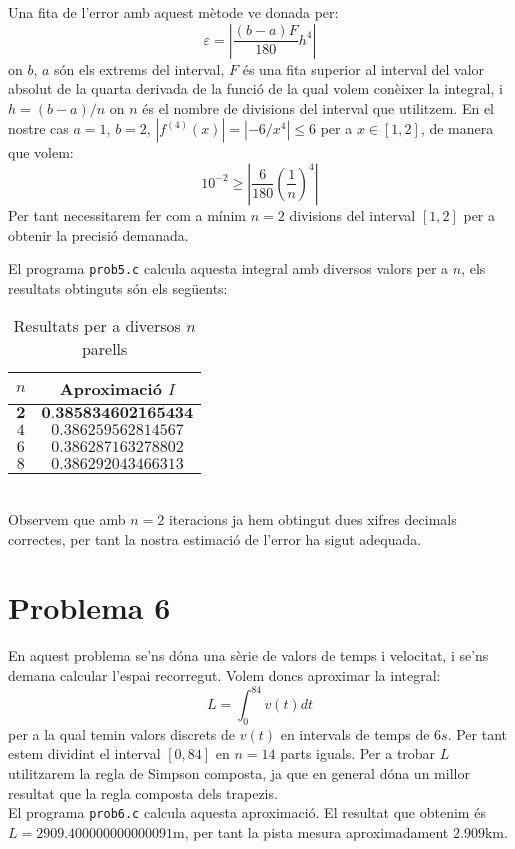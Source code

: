 \documentclass[12pt]{article}
\numberwithin{table}{section}
\numberwithin{figure}{section}
\numberwithin{equation}{section}
\begin{document}
	Una fita de l'error amb aquest mètode ve donada per:
	$$\varepsilon=\left|\dfrac{(b-a)F}{180}h^4 \right| $$
	on $b$, $a$ són els extrems del interval, $F$ és una fita superior al interval del valor absolut de la quarta derivada de la funció de la qual volem conèixer la integral, i $h=(b-a)/n$ on $n$ és el nombre de divisions del interval que utilitzem. En el nostre cas $a=1$, $b=2$, $|f^{(4)}(x)|=|-6/x^4|\leq6$ per a $x\in[1,2]$, de manera que volem:
	$$10^{-2}\geq\left| \frac{6}{180}\left( \dfrac{1}{n}\right)^4 \right| $$
	Per tant necessitarem fer com a mínim $n=2$ divisions del interval $[1,2]$ per a obtenir la precisió demanada.
	
	El programa \texttt{prob5.c} calcula aquesta integral amb diversos valors per a $n$, els resultats obtinguts són els següents:
	\begin{table}[h!]
		\centering
		\caption{Resultats per a diversos $n$ parells}	
		\begin{tabular}{c|c}
			$n$ & Aproximació $I$\\
			\hline
			\hline
			$\textbf{2}$ & $\textbf{0.385834602165434}$  \\
			$4$ & $0.386259562814567$ \\
			$6$ & $0.386287163278802$ \\
			$8$ & $0.386292043466313$ \\
		\end{tabular}
	\end{table}\\
	Observem que amb $n=2$ iteracions ja hem obtingut dues xifres decimals correctes, per tant la nostra estimació de l'error ha sigut adequada.
	
	\newpage
	\section*{Problema 6}
	En aquest problema se'ns dóna una sèrie de valors de temps i velocitat, i se'ns demana calcular l'espai recorregut. Volem doncs aproximar la integral:
	$$L=\int_{0}^{84}v(t)dt$$
	per a la qual temin valors discrets de $v(t)$ en intervals de temps de $6s$. Per tant estem dividint el interval $[0,84]$ en $n=14$ parts iguals. Per a trobar $L$ utilitzarem la regla de Simpson composta, ja que en general dóna un millor resultat que la regla composta dels trapezis. \\
	
	El programa \texttt{prob6.c} calcula aquesta aproximació. El resultat que obtenim és $L=2909.400000000000091$m, per tant la pista mesura aproximadament $2.909$km.
\end{document}
